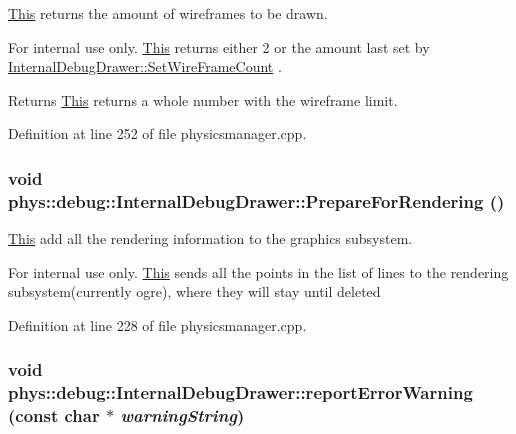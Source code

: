 \hyperlink{structThis}{This} returns the amount of wireframes to be drawn. 

\begin{DoxyInternal}{For internal use only.}
\hyperlink{structThis}{This} returns either 2 or the amount last set by \hyperlink{classphys_1_1debug_1_1InternalDebugDrawer_a76922fda7bb3b59d301e50d67e4f3c72}{InternalDebugDrawer::SetWireFrameCount} . \begin{DoxyReturn}{Returns}
\hyperlink{structThis}{This} returns a whole number with the wireframe limit. 
\end{DoxyReturn}
\end{DoxyInternal}


Definition at line 252 of file physicsmanager.cpp.

\hypertarget{classphys_1_1debug_1_1InternalDebugDrawer_a1002293d223ca20e5bccc3c3412ce262}{
\subsubsection[{PrepareForRendering}]{\setlength{\rightskip}{0pt plus 5cm}void phys::debug::InternalDebugDrawer::PrepareForRendering ()}}
\label{db/d27/classphys_1_1debug_1_1InternalDebugDrawer_a1002293d223ca20e5bccc3c3412ce262}


\hyperlink{structThis}{This} add all the rendering information to the graphics subsystem. 

\begin{DoxyInternal}{For internal use only.}
\hyperlink{structThis}{This} sends all the points in the list of lines to the rendering subsystem(currently ogre), where they will stay until deleted \end{DoxyInternal}


Definition at line 228 of file physicsmanager.cpp.

\hypertarget{classphys_1_1debug_1_1InternalDebugDrawer_a4e3b4cbc861f76696b4d32f0cf068ea6}{
\subsubsection[{reportErrorWarning}]{\setlength{\rightskip}{0pt plus 5cm}void phys::debug::InternalDebugDrawer::reportErrorWarning (const char $\ast$ {\em warningString})}}
\label{db/d27/classphys_1_1debug_1_1InternalDebugDrawer_a4e3b4cbc861f76696b4d32f0cf068ea6}


